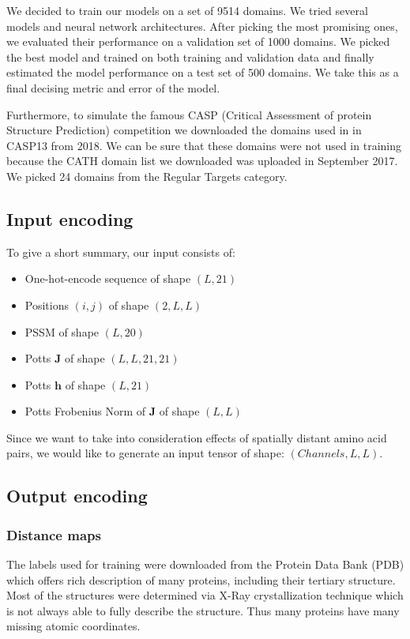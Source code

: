 We decided to train our models on a set of 9514 domains. 
We tried several models and neural network architectures. 
After picking the most promising ones, we evaluated their performance on a validation set of 1000 domains. 
We picked the best model and trained on both training and validation data and finally estimated the model performance on a test set of 500 domains. 
We take this as a final decising metric and error of the model. 
    
Furthermore, to simulate the famous CASP (Critical Assessment of protein Structure Prediction) competition we downloaded the domains used in in CASP13 from 2018. 
We can be sure that these domains were not used in training because the CATH domain list we downloaded was uploaded in September 2017. 
We picked 24 domains from the Regular Targets category.
    
\subsection{Input encoding}
To give a short summary, our input consists of:
    
\begin{itemize}
    \item One-hot-encode sequence of shape $(L, 21)$
    \item Positions $(i, j)$ of shape $(2, L, L)$
    \item PSSM of shape $(L, 20)$
    \item Potts $\bm{J}$ of shape $(L, L, 21, 21)$
    \item Potts $\bm{h}$ of shape $(L, 21)$
    \item Potts Frobenius Norm of $\bm{J}$ of shape $(L, L)$
\end{itemize}
        
Since we want to take into consideration effects of spatially distant amino acid pairs, we would like to generate an input tensor of shape: $(Channels, L, L)$.
    
\subsection{Output encoding}
        
\subsubsection{Distance maps}
The labels used for training were downloaded from the Protein Data Bank (PDB) which offers rich description of many proteins, including their tertiary structure. 
Most of the structures were determined via X-Ray crystallization technique which is not always able to fully describe the structure. 
Thus many proteins have many missing atomic coordinates. 
        
